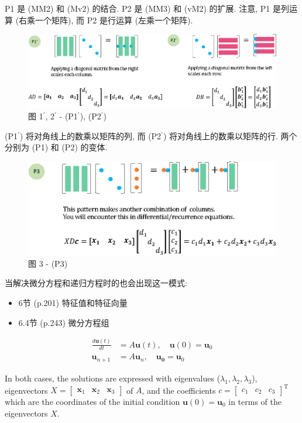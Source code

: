 \documentclass[letterpaper]{article}
\DeclareRobustCommand\transp{^{\mathrm{T}}}
\begin{document}
P1 是 (MM2) 和 (Mv2) 的结合. 
P2 是 (MM3) 和 (vM2) 的扩展. 
注意, P1 是列运算 (右乘一个矩阵), 
而 P2 是行运算 (左乘一个矩阵). 

\begin{figure}[H]
  \centering
  \includegraphics[scale=0.8]{Pattern11-22.eps}
  \caption{图 1$^\prime$, 2$^\prime$ - (P1$^\prime$), (P2$^\prime$)}
\end{figure}

(P1$^\prime$) 将对角线上的数乘以矩阵的列, 
而 (P2$^\prime$) 将对角线上的数乘以矩阵的行. 
两个分别为 (P1) 和 (P2) 的变体. 

\begin{figure}[H]
  \centering
  \includegraphics[scale=0.85]{Pattern3.eps}
  \caption{图 3 - (P3)}
\end{figure}

当解决微分方程和递归方程时的也会出现这一模式: 

\begin{itemize}
  \item 6节 (p.201) 特征值和特征向量
  \item 6.4节 (p.243) 微分方程组
\end{itemize} 

\begin{align*}
  \frac{d \bm{u}(t) }{dt} &= A \bm{u}(t), \quad \bm{u}(0)=\bm{u}_0\\
  \bm{u}_{n+1} &= A \bm{u}_n, \quad \bm{u_0} = \bm{u}_0
\end{align*}

In both cases, the solutions are expressed with
eigenvalues ($\lambda_1, \lambda_2, \lambda_3$), 
eigenvectors $X=\begin{bmatrix} \bm{x}_1 & \bm{x}_2 & \bm{x}_3 \end{bmatrix}$ of $A$, and
the coefficients $c=\begin{bmatrix} c_1 & c_2 & c_3 \end{bmatrix}\transp$
which are the coordinates of the initial condition $\bm{u}(0)=\bm{u}_0$ in terms of
the eigenvectors $X$.
\end{document}
